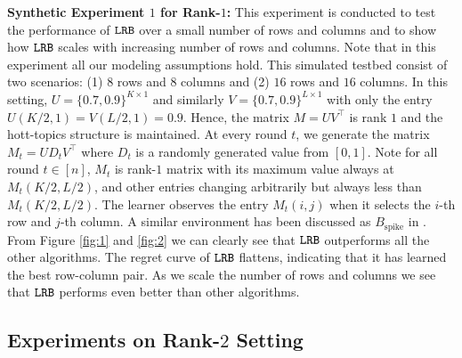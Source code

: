 \textbf{Synthetic Experiment $1$ for Rank-$1$:} This experiment is conducted to test the performance of ${\tt LRB}$ over a small number of rows and columns and to show how ${\tt LRB}$ scales with increasing number of rows and columns. Note that in this experiment all our modeling assumptions hold. This simulated testbed consist of two scenarios: (1) $8$ rows and $8$ columns and (2) $16$ rows and $16$ columns. In this setting, $U = \{0.7, 0.9\}^{K\times 1}$ and similarly $V = \{0.7, 0.9\}^{L\times 1}$ with only the entry $U(K/2,1) = V(L/2,1) = 0.9$. Hence, the matrix $M = UV^{\intercal}$ is rank $1$ and the hott-topics structure is maintained. At every round $t$, we generate the matrix $M_t = UD_tV^{\intercal}$ where $D_t$ is a randomly generated value from $[0,1]$. Note for all round $t\in [n]$, $M_t$ is rank-$1$ matrix with its maximum value always at $M_t(K/2,L/2)$, and other entries changing arbitrarily but always less than $M_t(K/2,L/2)$. The learner observes the entry $M_t(i,j)$ when it selects the $i$-th row and $j$-th column. A similar environment has been discussed as $B_{\text{spike}}$ in \citet{katariya2016stochastic}. From Figure \ref{fig:1} and \ref{fig:2} we can clearly see that ${\tt LRB}$ outperforms all the other algorithms. The regret curve of ${\tt LRB}$ flattens, indicating that it has learned the best row-column pair. As we scale the number of rows and columns we see that ${\tt LRB}$ performs even better than other algorithms. 

\subsection{Experiments on Rank-$2$ Setting}

